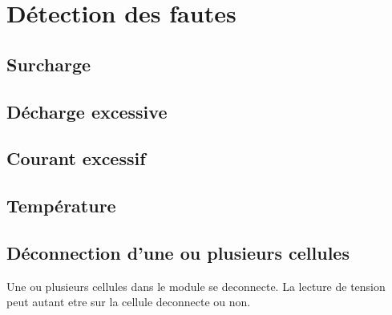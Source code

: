 
\section{Détection des fautes}
	\subsection{Surcharge}
	
	\subsection{Décharge excessive}
	
	\subsection{Courant excessif}
	
	\subsection{Température}
	
	\subsection{Déconnection d'une ou plusieurs cellules}
		Une ou plusieurs cellules dans le module se deconnecte. La lecture de tension peut autant etre sur la cellule deconnecte ou non.
	\subsection{}
	
	\subsection{}
	
	\subsection{}
	
	\subsection{}
	
	\subsection{}
	
	\subsection{}
	
